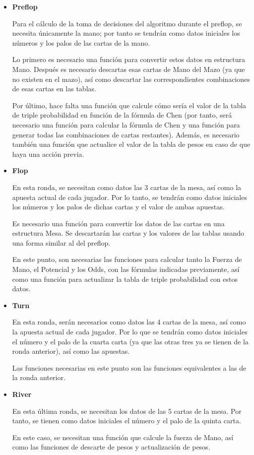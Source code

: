 \begin{itemize}
\item \textbf{Preflop}	

Para el cálculo de la toma de decisiones del algoritmo durante el preflop, se necesita únicamente la mano; por tanto se tendrán como datos iniciales los números y los palos de las cartas de la mano. 

Lo primero es necesario una función para convertir estos datos en estructura Mano. Después es necesario descartas esas cartas de Mano del Mazo (ya que no existen en el mazo), así como descartar las correspondientes combinaciones de esas cartas en las tablas.

Por último, hace falta una función que calcule cómo sería el valor de la tabla de triple probabilidad en función de la fórmula de Chen (por tanto, será necesario una función para calcular la fórmula de Chen y una función para generar todas las combinaciones de cartas restantes). Además, es necesario también una función que actualice el valor de la tabla de pesos en caso de que haya una acción previa.	

\item \textbf{Flop}	

En esta ronda, se necesitan como datos las 3 cartas de la mesa, así como la apuesta actual de cada jugador. Por lo tanto, se tendrán como datos iniciales los números y los palos de dichas cartas y el valor de ambas apuestas.

Es necesario una función para convertir los datos de las cartas en una estructura Mesa. Se descartarán las cartas y los valores de las tablas usando una forma similar al del preflop.

En este punto, son necesarias las funciones para calcular tanto la Fuerza de Mano, el Potencial y los Odds, con las fórmulas indicadas previamente, así como una función para actualizar la tabla de triple probabilidad con estos datos.

\item \textbf{Turn}

En esta ronda, serán necesarios como datos las 4 cartas de la mesa, así como la apuesta actual de cada jugador. Por lo que se tendrán como datos iniciales el número y el palo de la cuarta carta (ya que las otras tres ya se tienen de la ronda anterior), así como las apuestas.

Las funciones necesarias en este punto son las funciones equivalentes a las de la ronda anterior.

\item \textbf{River}

En esta última ronda, se necesitan los datos de las 5 cartas de la mesa. Por tanto, se tienen como datos iniciales el número y el palo de la quinta carta.

En este caso, se necesitan una función que calcule la fuerza de Mano, así como las funciones de descarte de pesos y actualización de pesos.

\end{itemize}

